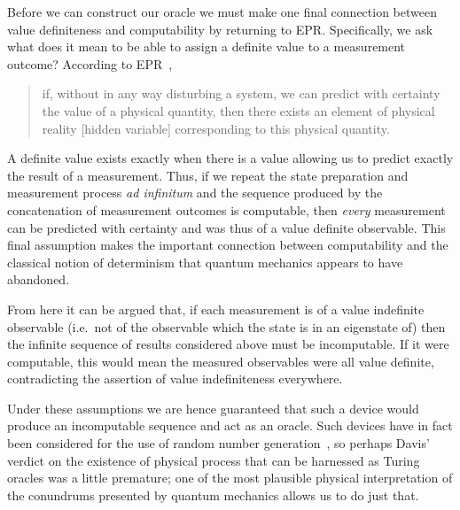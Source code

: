\documentclass{comjnl}
\begin{document}
Before we can construct our oracle we must make one final connection between value definiteness and computability by returning to EPR.
Specifically, we ask what does it mean to be able to assign a definite value to a measurement outcome?
According to EPR~\cite{epr},
\begin{quote}
	if, without in any way disturbing a system, we can predict with certainty the value of a physical quantity, then there exists an element of physical reality [hidden variable] corresponding to this physical quantity.
\end{quote}
A definite value exists exactly when there is a value allowing us to predict exactly the result of a measurement.
Thus, if we repeat the state preparation and measurement process \textit{ad infinitum} and the sequence produced by the concatenation of measurement outcomes is computable, then \emph{every} measurement can be predicted with certainty and was thus of a value definite observable.
This final assumption makes the important connection between computability and the classical notion of determinism that quantum mechanics appears to have abandoned.

From here it can be argued that, if each measurement is of a value indefinite observable (i.e.\ not of the observable which the state is in an eigenstate of) then the infinite sequence of results considered above must be incomputable.
If it were computable, this would mean the measured observables were all value definite, contradicting the assertion of value indefiniteness everywhere.

Under these assumptions we are hence guaranteed that such a device would produce an incomputable sequence and act as an oracle.
Such devices have in fact been considered for the use of random number generation~\cite{Abbott:2010uq}, so perhaps Davis' verdict on the existence of physical process that can be harnessed as Turing oracles was a little premature; one of the most plausible physical interpretation of the conundrums presented by quantum mechanics allows us to do just that.
\end{document}
